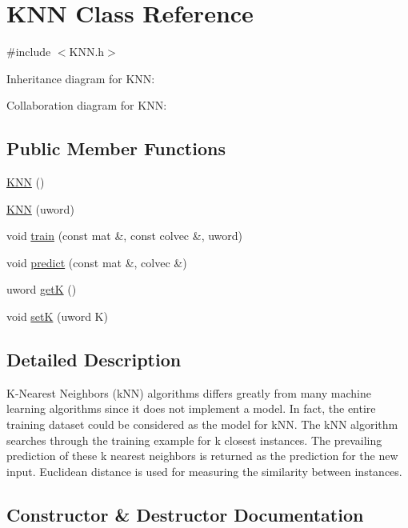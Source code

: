\hypertarget{classKNN}{}\section{K\+NN Class Reference}
\label{classKNN}


{\ttfamily \#include $<$K\+N\+N.\+h$>$}



Inheritance diagram for K\+NN\+:


Collaboration diagram for K\+NN\+:
\subsection*{Public Member Functions}
\begin{DoxyCompactItemize}
\item 
\hyperlink{classKNN_af5736f84aa09d2acbd4e5f6f4584820f}{K\+NN} ()
\item 
\hyperlink{classKNN_af967fef8cb9c49756f7355162fd513a0}{K\+NN} (uword)
\item 
void \hyperlink{classKNN_ad33321bbef850109228ba5ffef188cdd}{train} (const mat \&, const colvec \&, uword)
\item 
void \hyperlink{classKNN_adbcbfadf1460448dfcece84f796874db}{predict} (const mat \&, colvec \&)
\item 
uword \hyperlink{classKNN_af3dbfc1ce1580160ea0f9969520111c3}{getK} ()
\item 
void \hyperlink{classKNN_ab35b0d16ec11def3b20ae9b8d7a81868}{setK} (uword K)
\end{DoxyCompactItemize}


\subsection{Detailed Description}
K-\/\+Nearest Neighbors (k\+NN) algorithms differs greatly from many machine learning algorithms since it does not implement a model. In fact, the entire training dataset could be considered as the model for k\+NN. The k\+NN algorithm searches through the training example for k closest instances. The prevailing prediction of these k nearest neighbors is returned as the prediction for the new input. Euclidean distance is used for measuring the similarity between instances. 

\subsection{Constructor \& Destructor Documentation}
